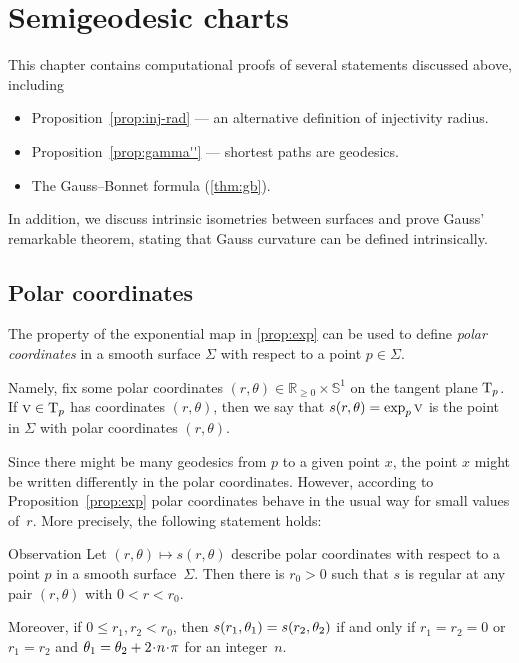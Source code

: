 \chapter{Semigeodesic charts}
\label{chap:semigeodesic}

This chapter contains computational proofs of several statements discussed above, including 
\begin{itemize}
\item Proposition~\ref{prop:inj-rad} --- an alternative definition of injectivity radius.
\item Proposition~\ref{prop:gamma''} --- shortest paths are geodesics.
\item The Gauss--Bonnet formula (\ref{thm:gb}).
\end{itemize}
In addition, we discuss intrinsic isometries between surfaces and prove Gauss' remarkable theorem, stating that Gauss curvature can be defined intrinsically.

\section{Polar coordinates}

The property of the exponential map in \ref{prop:exp} can be used to define \emph{polar coordinates} in a smooth surface $\Sigma$ with respect to a point $p\in \Sigma$.

Namely, fix some polar coordinates $(r,\theta) \in \mathbb{R}_{\ge0} \times \mathbb{S}^1  $ on the tangent plane $\mathrm{T}_p$.
If $\text{\sc{v}}\in \mathrm{T}_p$ has coordinates $(r,\theta)$,
then we say that $s(r,\theta)\z=\exp_p\vec v$ is the point in $\Sigma$ with  polar coordinates $(r,\theta)$.


Since there might be many geodesics from $p$ to a given point $x$,
the point $x$ might be written differently in the polar coordinates.
However, according to Proposition~\ref{prop:exp} polar coordinates behave in  the usual way for small values of~$r$.
More precisely, the following statement holds:

\begin{thm}{Observation}\label{obs:polar}
Let $(r,\theta)\mapsto s(r,\theta)$ describe polar coordinates with respect to a point $p$ in a  smooth surface~$\Sigma$.
Then there is $r_0>0$ such that $s$ is  regular at any pair $(r,\theta)$ with $0<r<r_0$.

Moreover, if $0\le r_1,r_2<r_0$, then $s(r_1,\theta_1) \z= s(r_2,\theta_2)$ if and only if
$r_1=r_2=0$ or $r_1=r_2$ and $\theta_1\z=\theta_2+2\cdot n\cdot\pi$ for an integer~$n$.
\end{thm}

